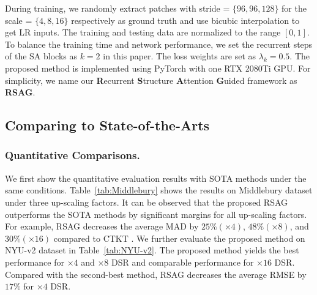 \documentclass[letterpaper]{article} %
\begin{document}
During training, we randomly extract patches with stride = $\{96,96,128\}$ for the scale = $\{4,8,16\}$ respectively as ground truth and use bicubic interpolation to get LR inputs. The training and testing data are normalized to the range $[0,1]$.
To balance the training time and network performance, we set the recurrent steps of the SA blocks as $k=2$ in this paper.
The loss weights are set as $\lambda _{k}=0.5$. The proposed method is implemented using PyTorch with one RTX 2080Ti GPU. For simplicity, we name our \textbf{R}ecurrent \textbf{S}tructure \textbf{A}ttention \textbf{G}uided framework as \textbf{RSAG}.

\subsection{Comparing to State-of-the-Arts}
\subsubsection{Quantitative Comparisons.}
We first show the quantitative evaluation results with SOTA methods under the same conditions. Table~\ref{tab:Middlebury} shows the results on Middlebury dataset under three up-scaling factors. It can be observed that the proposed RSAG outperforms the SOTA methods by significant margins for all up-scaling factors. For example, RSAG decreases the average MAD by $25\% (\times4)$, $48\% (\times8)$, and $30\% (\times16)$ compared to  CTKT \cite{sun2021learning}. We further evaluate the proposed method on NYU-v2 dataset in Table~\ref{tab:NYU-v2}. The proposed method yields the best performance for $\times4$ and $\times8$ DSR and comparable performance for $\times16$ DSR. Compared with the second-best method, RSAG decreases the average RMSE by $17\%$ for $\times4$ DSR.



\begin{table}[t]
	\centering
\caption{Quantitative comparisons (in RMSE) on Lu dataset and RGB-D-D dataset.}\label{tab:RGB-D-D}
\end{table}
\end{document}
